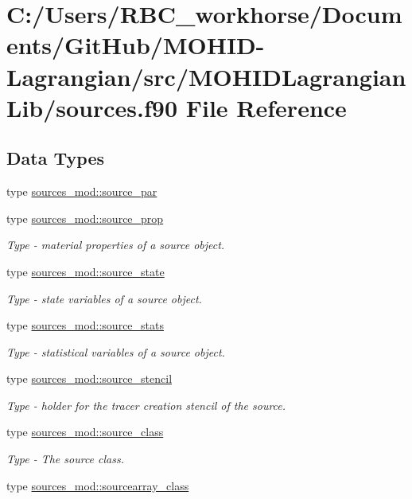 \hypertarget{sources_8f90}{}\section{C\+:/\+Users/\+R\+B\+C\+\_\+workhorse/\+Documents/\+Git\+Hub/\+M\+O\+H\+I\+D-\/\+Lagrangian/src/\+M\+O\+H\+I\+D\+Lagrangian\+Lib/sources.f90 File Reference}
\label{sources_8f90}
\subsection*{Data Types}
\begin{DoxyCompactItemize}
\item 
type \mbox{\hyperlink{structsources__mod_1_1source__par}{sources\+\_\+mod\+::source\+\_\+par}}
\item 
type \mbox{\hyperlink{structsources__mod_1_1source__prop}{sources\+\_\+mod\+::source\+\_\+prop}}
\begin{DoxyCompactList}\small\item\em Type -\/ material properties of a source object. \end{DoxyCompactList}\item 
type \mbox{\hyperlink{structsources__mod_1_1source__state}{sources\+\_\+mod\+::source\+\_\+state}}
\begin{DoxyCompactList}\small\item\em Type -\/ state variables of a source object. \end{DoxyCompactList}\item 
type \mbox{\hyperlink{structsources__mod_1_1source__stats}{sources\+\_\+mod\+::source\+\_\+stats}}
\begin{DoxyCompactList}\small\item\em Type -\/ statistical variables of a source object. \end{DoxyCompactList}\item 
type \mbox{\hyperlink{structsources__mod_1_1source__stencil}{sources\+\_\+mod\+::source\+\_\+stencil}}
\begin{DoxyCompactList}\small\item\em Type -\/ holder for the tracer creation stencil of the source. \end{DoxyCompactList}\item 
type \mbox{\hyperlink{structsources__mod_1_1source__class}{sources\+\_\+mod\+::source\+\_\+class}}
\begin{DoxyCompactList}\small\item\em Type -\/ The source class. \end{DoxyCompactList}\item 
type \mbox{\hyperlink{structsources__mod_1_1sourcearray__class}{sources\+\_\+mod\+::sourcearray\+\_\+class}}
\end{DoxyCompactItemize}
